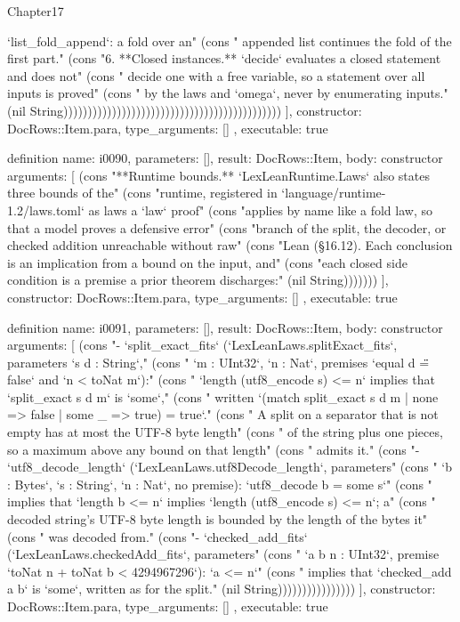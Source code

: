 \begin{lexlean}{Chapter17}
\begin{semanticmodule}
{{`list_fold_append`: a fold over an" (cons "   appended list continues the fold of the first part." (cons "6. **Closed instances.** `decide` evaluates a closed statement and does not" (cons "   decide one with a free variable, so a statement over all inputs is proved" (cons "   by the laws and `omega`, never by enumerating inputs." (nil String)))))))))))))))))))))))))))))))))))))))))))))
    ],
    constructor: DocRows::Item.para,
    type_arguments: []
  },
  executable: true
}

definition{
  name: i0090,
  parameters: [],
  result: DocRows::Item,
  body: constructor{
    arguments: [
      (cons "**Runtime bounds.** `LexLeanRuntime.Laws` also states three bounds of the" (cons "runtime, registered in `language/runtime-1.2/laws.toml` as laws a `law` proof" (cons "applies by name like a fold law, so that a model proves a defensive error" (cons "branch of the split, the decoder, or checked addition unreachable without raw" (cons "Lean (§16.12). Each conclusion is an implication from a bound on the input, and" (cons "each closed side condition is a premise a prior theorem discharges:" (nil String)))))))
    ],
    constructor: DocRows::Item.para,
    type_arguments: []
  },
  executable: true
}

definition{
  name: i0091,
  parameters: [],
  result: DocRows::Item,
  body: constructor{
    arguments: [
      (cons "- `split_exact_fits` (`LexLeanLaws.splitExact_fits`, parameters `s d : String`," (cons "  `m : UInt32`, `n : Nat`, premises `equal d \"\" = false` and `n < toNat m`):" (cons "  `length (utf8_encode s) <= n` implies that `split_exact s d m` is `some`," (cons "  written `(match split_exact s d m | none => false | some _ => true) = true`." (cons "  A split on a separator that is not empty has at most the UTF-8 byte length" (cons "  of the string plus one pieces, so a maximum above any bound on that length" (cons "  admits it." (cons "- `utf8_decode_length` (`LexLeanLaws.utf8Decode_length`, parameters" (cons "  `b : Bytes`, `s : String`, `n : Nat`, no premise): `utf8_decode b = some s`" (cons "  implies that `length b <= n` implies `length (utf8_encode s) <= n`; a" (cons "  decoded string's UTF-8 byte length is bounded by the length of the bytes it" (cons "  was decoded from." (cons "- `checked_add_fits` (`LexLeanLaws.checkedAdd_fits`, parameters" (cons "  `a b n : UInt32`, premise `toNat n + toNat b < 4294967296`): `a <= n`" (cons "  implies that `checked_add a b` is `some`, written as for the split." (nil String))))))))))))))))
    ],
    constructor: DocRows::Item.para,
    type_arguments: []
  },
  executable: true
}


\end{semanticmodule}
\end{lexlean}
